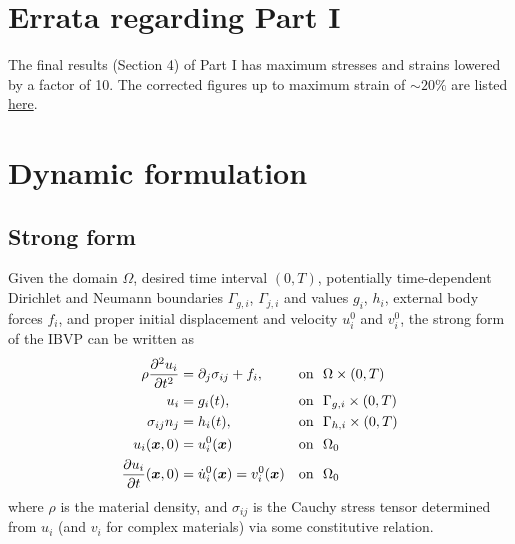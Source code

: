 \pagestyle{fancy}
\setlength{\headheight}{16pt}
\fancyhead{} %
\fancyfoot{} %
\fancyfoot[C]{\thepage}

\section*{Errata regarding Part I}
The final results (Section 4) of Part I has maximum stresses and strains lowered by a factor of 10. 
The corrected figures up to maximum strain of $\sim 20\%$ are listed \href{https://github.com/sy-cui/CSE552-FA2024/tree/main/doc/final/part1}{here}.

\section{Dynamic formulation}
\subsection{Strong form}
Given the domain $\Omega$, desired time interval $(0, T)$, potentially time-dependent Dirichlet and Neumann boundaries $\Gamma_{g,i}$, $\Gamma_{j,i}$ and values $g_i$, $h_i$, external body forces $f_i$, and proper initial displacement and velocity $u_i^0$ and $v_i^0$, the strong form of the IBVP can be written as 
\begin{align}
    \rho \frac{\partial^2 u_i}{\partial t^2} &= \partial_j \sigma_{ij} + f_i, && \textrm{on} ~~ \Omega \times (0, T) \\
    u_i &= g_i(t), && \textrm{on} ~~ \Gamma_{g,i} \times (0, T) \\
    \sigma_{ij} n_j &= h_i(t), && \textrm{on} ~~ \Gamma_{h,i} \times (0, T) \\
    u_i(\bm{x}, 0) &= u_i^0(\bm{x}) && \textrm{on} ~~ \Omega_0 \\
    \frac{\partial u_i}{\partial t}(\bm{x}, 0) &= \dot{u}_i^0(\bm{x}) = v_i^0(\bm{x}) && \textrm{on} ~~ \Omega_0
\end{align}
where $\rho$ is the material density, and $\sigma_{ij}$ is the Cauchy stress tensor determined from $u_i$ (and $v_i$ for complex materials) via some constitutive relation. 


